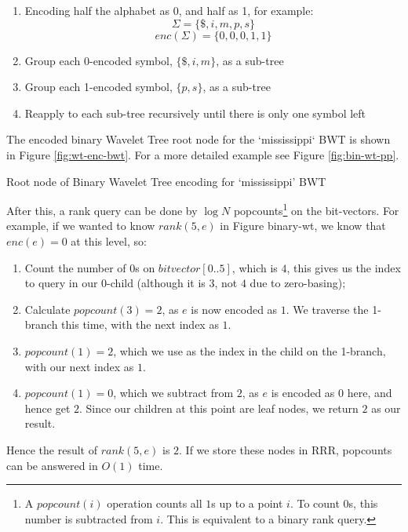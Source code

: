 \begin{enumerate}
    \item
		Encoding half the alphabet as 0, and half as 1, for example:
    		$$\Sigma = \{ \$, i, m, p, s \}$$
			$$enc(\Sigma) = \{ 0, 0, 0, 1, 1 \}$$
    \item
		Group each 0-encoded symbol, $\{ \$, i, m \}$, as a sub-tree
    \item
		Group each 1-encoded symbol, $\{ p, s \}$, as a sub-tree
    \item
		Reapply to each sub-tree recursively until there is only one symbol
    	left
\end{enumerate}

The encoded binary Wavelet Tree root node for the `mississippi` BWT is shown in Figure \ref{fig:wt-enc-bwt}. For a more detailed example see Figure \ref{fig:bin-wt-pp}.


			{Root node of Binary Wavelet Tree encoding for `mississippi' BWT}


After this, a rank query can be done by $\log N$ popcounts\footnote{A
$popcount(i)$ operation counts all $1$s up to a point $i$. To count $0$s, this
number is subtracted from $i$. This is equivalent to a binary rank query.} on 
the bit-vectors. For example, if we wanted to know $rank(5, e)$ in Figure 
binary-wt, we know that $enc(e) = 0$ at this level, so:

\begin{enumerate}
    \item
		Count the number of $0$s on $bitvector[0..5]$, which is $4$, this
   		gives us the index to query in our 0-child (although it is $3$, not $4$ 
		due to zero-basing);
    \item
		Calculate $popcount(3) = 2$, as $e$ is now encoded as $1$. We traverse
    	the 1-branch this time, with the next index as $1$.
    \item
		$popcount(1) = 2$, which we use as the index in the child on the
    	1-branch, with our next index as $1$.
    \item
		$popcount(1) = 0$, which we subtract from $2$, as $e$ is encoded as
    	$0$ here, and hence get $2$. Since our children at this point are leaf
    	nodes, we return $2$ as our result.
\end{enumerate}

Hence the result of $rank(5, e)$ is $2$. If we store these nodes in RRR, 
popcounts can be answered in $O(1)$ time.


